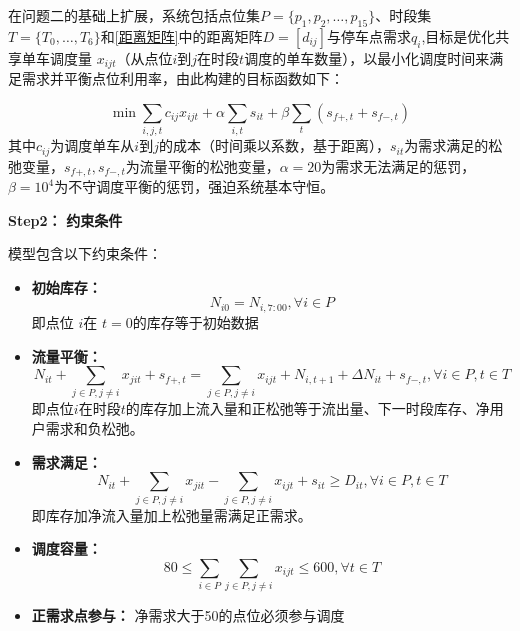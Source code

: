 \documentclass[withoutpreface,bwprint]{cumcmthesis}
\begin{document}
在问题二的基础上扩展，系统包括点位集$P=\{p_1,p_2,\dots,p_{15}\}$、时段集$T=\{T_0,\dots,T_6\}$和\ref{距离矩阵}中的距离矩阵$D = [d_{ij}]$与停车点需求$q_i$,目标是优化共享单车调度量 $x_{ijt}$（从点位$i$到$j$在时段$t$调度的单车数量），以最小化调度时间来满足需求并平衡点位利用率，由此构建的目标函数如下：

\begin{equation}
    \min \sum_{i, j, t} c_{ij} x_{ijt} + \alpha \sum_{i, t} s_{it} + \beta \sum_t (s_{f+, t} + s_{f-, t})
\end{equation}
其中$c_{ij}$为调度单车从$i$到$j$的成本（时间乘以系数，基于距离），$s_{it}$为需求满足的松弛变量，$s_{f+, t}, s_{f-, t}$为流量平衡的松弛变量，$\alpha=20$为需求无法满足的惩罚，$\beta=10^4$为不守调度平衡的惩罚，强迫系统基本守恒。

\textbf{Step2：} \textbf{约束条件}

模型包含以下约束条件：
\begin{itemize}
    \item \textbf{初始库存：} 
    \begin{equation}
        N_{i0} = N_{i, 7:00}, \forall i \in P
    \end{equation}
    即点位 $i $在 $t=0 $的库存等于初始数据
    \item \textbf{流量平衡：}
    \begin{equation}
        N_{it} + \sum_{j \in P, j \neq i} x_{jit} + s_{f+, t} = \sum_{j \in P, j \neq i} x_{ijt} + N_{i,t+1} + \Delta N_{it} + s_{f-, t}, \forall i \in P, t \in T
    \end{equation}
    即点位$ i $在时段$ t $的库存加上流入量和正松弛等于流出量、下一时段库存、净用户需求和负松弛。
    \item \textbf{需求满足：}
    \begin{equation}
        N_{it} + \sum_{j \in P, j \neq i} x_{jit} - \sum_{j \in P, j \neq i} x_{ijt} + s_{it} \geq D_{it}, \forall i \in P, t \in T
    \end{equation}
    即库存加净流入量加上松弛量需满足正需求。
    \item \textbf{调度容量：}
    \begin{equation}
        80 \leq \sum_{i \in P} \sum_{j \in P, j \neq i} x_{ijt} \leq 600, \forall t \in T
    \end{equation}
    \item \textbf{正需求点参与：}
    净需求大于50的点位必须参与调度
\end{itemize}
\end{document}
